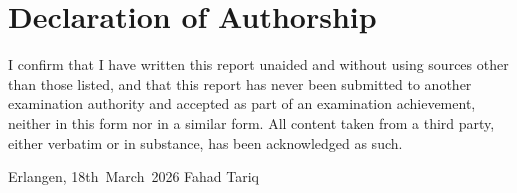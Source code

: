 \documentclass[a4paper,11pt]{article}
\begin{document}

\newpage
\thispagestyle{empty}
\section*{Declaration of Authorship}

I confirm that I have written this report unaided and without using sources other than
those listed, and that this report has never been submitted to another examination
authority and accepted as part of an examination achievement, neither in this form nor in
a similar form. All content taken from a third party, either verbatim or in substance,
has been acknowledged as such.

\vspace{3cm}

\noindent
Erlangen, 18th~March~2026 \hfill Fahad Tariq
\end{document}
